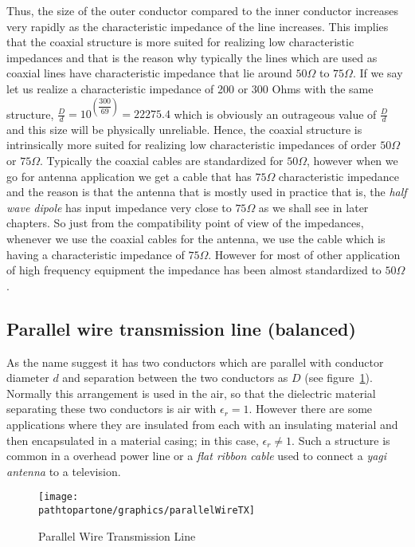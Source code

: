 Thus, the size of the outer conductor compared to the inner conductor increases very rapidly as the characteristic impedance of the line increases. This implies that the coaxial structure is more suited for realizing low characteristic impedances and that is the reason why typically the lines which are used as coaxial lines have characteristic impedance that lie around $50\varOmega$ to $75\varOmega$. If we say let us realize a characteristic impedance of 200 or 300 Ohms with the same structure, $\frac{D}{d} = 10^{\left(\dfrac{300}{69}\right)} = 22275.4$ which is obviously an outrageous value of $\frac{D}{d}$ and this size will be physically unreliable. Hence, the coaxial structure is intrinsically more suited for realizing low characteristic impedances of order $50\varOmega$ or $75\varOmega$. Typically the coaxial cables are standardized for $50\varOmega$, however when we go for antenna application we get a cable that has $75\varOmega$ characteristic impedance and the reason is that the antenna that is mostly used in practice that is, the \emph{half wave dipole} has input impedance very close to $75\varOmega$ as we shall see in later chapters. So just from the compatibility point of view of the impedances, whenever we use the coaxial cables for the antenna, we use the cable which is having a characteristic impedance of $75\varOmega$. However for most of other application of high frequency equipment the impedance has been almost standardized to $50\varOmega$.

\subsection{Parallel wire transmission line (balanced)} 
As the name suggest it has two conductors which are parallel with conductor diameter $d$ and separation between the two conductors as $D$ (see figure~\ref{fig:parallelwiretx}). Normally this arrangement is used in the air, so that the dielectric material separating these two conductors is air with $\epsilon_r=1$. However there are some applications where they are insulated from each with an insulating material and then encapsulated in a material casing; in this case, $\epsilon_r\neq1$. Such a structure is common in a overhead power line or a \emph{flat ribbon cable} used to connect a \emph{yagi antenna} to a television.
\begin{figure}[h]
\centering
\texttt{[image: \\pathtopartone/graphics/parallelWireTX]}
\caption{Parallel Wire Transmission Line}
\label{fig:parallelwiretx}
\end{figure}

